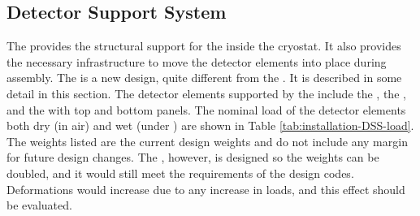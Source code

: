 \subsection{Detector Support System}
\label{sec:fdsp-tc-infr-dss}

The  provides the structural support for the  inside the cryostat.  
It also provides the necessary infrastructure to move the detector elements into place during
assembly. 
The  is a new design, quite different from the  . It is described in some detail in this
section. 
The detector elements supported by the  include the , the , and the  with top and bottom  panels. The nominal load of the detector elements both dry (in air) and wet (under ) are shown in Table \ref{tab:installation-DSS-load}. The weights listed are the current design weights and do not include any margin for future design changes.  
The , however, is designed so the weights can be doubled, and it would still meet the requirements of the design codes.  
Deformations would increase due to any increase in loads, and this effect should be evaluated.
